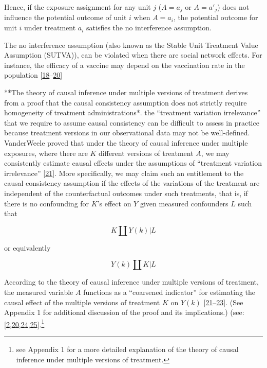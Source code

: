 \documentclass[
  singlecolumn]{article}
\begin{document}
Hence, if the exposure assignment for any unit \(j\) (\(A=a_j\) or
\(A=a'_j\)) does not influence the potential outcome of unit \(i\) when
\(A=a_i\), the potential outcome for unit \(i\) under treatment \(a_i\)
satisfies the no interference assumption.

The no interference assumption (also known as the Stable Unit Treatment
Value Assumption (SUTVA)), can be violated when there are social network
effects. For instance, the efficacy of a vaccine may depend on the
vaccination rate in the population
{[}\protect\hyperlink{ref-ogburn2022}{18}--\protect\hyperlink{ref-murray2021a}{20}{]}

**The theory of causal inference under multiple versions of treatment
derives from a proof that the causal consistency assumption does not
strictly require homogeneity of treatment administrations*. the
``treatment variation irrelevance'' that we require to assume causal
consistency can be difficult to assess in practice because treatment
versions in our observational data may not be well-defined. VanderWeele
proved that under the theory of causal inference under multiple
exposures, where there are \(K\) different versions of treatment \(A\),
we may consistently estimate causal effects under the assumptions of
``treatment variation irrelevance''
{[}\protect\hyperlink{ref-vanderweele2009}{21}{]}. More specifically, we
may claim such an entitlement to the causal consistency assumption if
the effects of the variations of the treatment are independent of the
counterfactual outcomes under such treatments, that is, if there is no
confounding for \(K\)'s effect on \(Y\) given measured confounders \(L\)
such that

\[
K \coprod Y(k) | L
\]

or equivalently

\[
Y(k) \coprod K | L
\]

According to the theory of causal inference under multiple versions of
treatment, the measured variable \(A\) functions as a ``coarsened
indicator'' for estimating the causal effect of the multiple versions of
treatment \(K\) on \(Y(k)\)
{[}\protect\hyperlink{ref-vanderweele2009}{21}--\protect\hyperlink{ref-vanderweele2018}{23}{]}.
(See Appendix 1 for additional discussion of the proof and its
implications.) (see:
{[}\protect\hyperlink{ref-bulbulia2022}{2},\protect\hyperlink{ref-murray2021a}{20},\protect\hyperlink{ref-hernuxe1n2022a}{24},\protect\hyperlink{ref-hernuxe1n2008}{25}{]}.\footnote{see
  Appendix 1 for a more detailed explanation of the theory of causal
  inference under multiple versions of treatment.}
\end{document}
